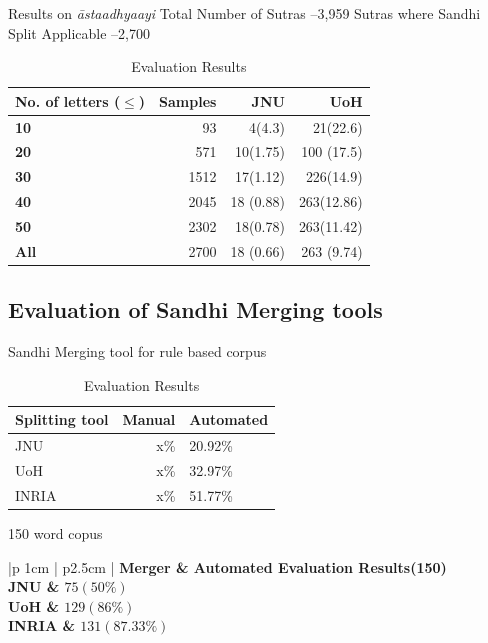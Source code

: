 \documentclass[11pt]{article}
\begin{document}
Results on \textit{\={a}staadhyaayi}
Total Number of Sutras –3,959
Sutras where Sandhi Split Applicable –2,700
    


\begin{table}[h]
\begin{center}
\begin{tabular}{ p{2cm}  r r r }
\hline  
\bf No. of letters ($\le$) & Samples & JNU & UoH \\
\hline
\bf 10 & 93 & 4(4.3) & 21(22.6) \\
\bf 20 & 571 & 10(1.75) & 100 (17.5) \\
\bf 30 & 1512 & 17(1.12) & 226(14.9) \\
\bf 40 & 2045 & 18 (0.88) & 263(12.86) \\
\bf 50 & 2302 & 18(0.78) & 263(11.42) \\
\bf All  & 2700 & 18 (0.66) & 263 (9.74) \\
\hline
\end{tabular}
\end{center}
\caption{\label{font-table} Evaluation Results }
\end{table}


\subsection{Evaluation of Sandhi Merging tools}

Sandhi Merging tool for rule based corpus

\begin{table}[h]
	\begin{center}
		\begin{tabular}{|l|rl|}
			\hline \bf Splitting tool & \bf Manual \bf & Automated \\ \hline
			JNU&x\%&20.92\% \\
			UoH&x\%&32.97\% \\
			INRIA&x\%&51.77\% \\
			\hline
		\end{tabular}
	\end{center}
	\caption{\label{font-table} Evaluation Results }
\end{table}


150 word copus

\begin{table}[h]
	\begin{center}
		\begin{tabular}{|p {1cm}  | p{2.5cm} |}
			\hline \bf  Merger & \bf Automated Evaluation Results(150) \\
			\hline
			JNU &  $75 (50\%)$\\
			UoH &  $129 (86\%)$\\
			INRIA & $131 (87.33\%)$\\
			\hline
		\end{tabular}
	\end{center}
	\caption{\label{font-table} Evaluation Results }
\end{table}
\end{document}
